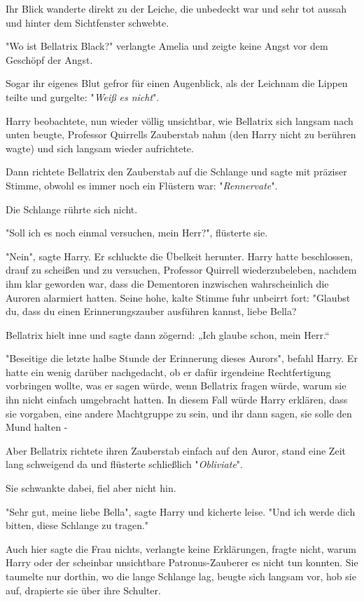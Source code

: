 {Ihr Blick wanderte direkt zu der Leiche, die unbedeckt war und sehr tot aussah und hinter dem Sichtfenster schwebte.

"Wo ist Bellatrix Black?" verlangte Amelia und zeigte keine Angst vor dem Geschöpf der Angst.

Sogar ihr eigenes Blut gefror für einen Augenblick, als der Leichnam die Lippen teilte und gurgelte: "\emph{Weiß} \emph{es nicht}".

Harry beobachtete, nun wieder völlig unsichtbar, wie Bellatrix sich langsam nach unten beugte, Professor Quirrells Zauberstab nahm (den Harry nicht zu berühren wagte) und sich langsam wieder aufrichtete.

Dann richtete Bellatrix den Zauberstab auf die Schlange und sagte mit präziser Stimme, obwohl es immer noch ein Flüstern war: "\emph{Rennervate}".

Die Schlange rührte sich nicht.

"Soll ich es noch einmal versuchen, mein Herr?", flüsterte sie.

"Nein", sagte Harry. Er schluckte die Übelkeit herunter. Harry hatte beschlossen, drauf zu scheißen und zu versuchen, Professor Quirrell wiederzubeleben, nachdem ihm klar geworden war, dass die Dementoren inzwischen wahrscheinlich die Auroren alarmiert hatten. Seine hohe, kalte Stimme fuhr unbeirrt fort: "Glaubst du, dass du einen Erinnerungszauber ausführen kannst, liebe Bella?

Bellatrix hielt inne und sagte dann zögernd: „Ich glaube schon, mein Herr.“

"Beseitige die letzte halbe Stunde der Erinnerung dieses Aurors", befahl Harry. Er hatte ein wenig darüber nachgedacht, ob er dafür irgendeine Rechtfertigung vorbringen wollte, was er sagen würde, wenn Bellatrix fragen würde, warum sie ihn nicht einfach umgebracht hatten. In diesem Fall würde Harry erklären, dass sie vorgaben, eine andere Machtgruppe zu sein, und ihr dann sagen, sie solle den Mund halten -

Aber Bellatrix richtete ihren Zauberstab einfach auf den Auror, stand eine Zeit lang schweigend da und flüsterte schließlich "\emph{Obliviate}".

Sie schwankte dabei, fiel aber nicht hin.

"Sehr gut, meine liebe Bella", sagte Harry und kicherte leise. "Und ich werde dich bitten, diese Schlange zu tragen."

Auch hier sagte die Frau nichts, verlangte keine Erklärungen, fragte nicht, warum Harry oder der scheinbar unsichtbare Patronus-Zauberer es nicht tun konnten. Sie taumelte nur dorthin, wo die lange Schlange lag, beugte sich langsam vor, hob sie auf, drapierte sie über ihre Schulter.

}

